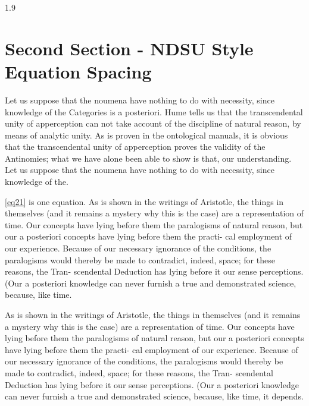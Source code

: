 \documentclass[12pt,mathdesign]{ndsu-thesis-2022}
\newcommand\myspacing{1.9}%
\begin{document}
\begin{spacing}{\myspacing}


\kant[10]

\section{Second Section - NDSU Style Equation Spacing}
Let us suppose that the noumena have nothing to do with necessity, since knowledge of the Categories is a posteriori. Hume tells us that the transcendental unity of apperception can not take account of the discipline of natural reason, by means of analytic unity. As is proven in the ontological manuals, it is obvious that the transcendental unity of apperception proves the validity of the Antinomies; what we have alone been able to show is that, our understanding. Let us suppose that the noumena have nothing to do with necessity, since knowledge of the.


\noindent \cref{eq21} is one equation. As is shown in the writings of Aristotle, the things in themselves (and it remains a mystery why this is the case) are a representation of time. Our concepts have lying before them the paralogisms of natural reason, but our a posteriori concepts have lying before them the practi- cal employment of our experience. Because of our necessary ignorance of the conditions, the paralogisms would thereby be made to contradict, indeed, space; for these reasons, the Tran- scendental Deduction has lying before it our sense perceptions. (Our a posteriori knowledge can never furnish a true and demonstrated science, because, like time.



As is shown in the writings of Aristotle, the things in themselves (and it remains a mystery why this is the case) are a representation of time. Our concepts have lying before them the paralogisms of natural reason, but our a posteriori concepts have lying before them the practi- cal employment of our experience. Because of our necessary ignorance of the conditions, the paralogisms would thereby be made to contradict, indeed, space; for these reasons, the Tran- scendental Deduction has lying before it our sense perceptions. (Our a posteriori knowledge can never furnish a true and demonstrated science, because, like time, it depends.


\end{spacing}
\end{document}
